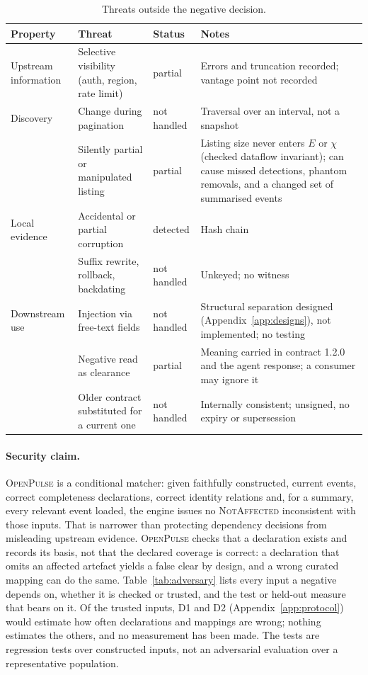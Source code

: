\documentclass[11pt,a4paper]{article}
\newcommand{\op}{\textsc{OpenPulse}}
\begin{document}
\begin{table}[t]
\centering
\footnotesize
\begin{tabularx}{\linewidth}{@{}>{\raggedright\arraybackslash}p{2.6cm} >{\raggedright\arraybackslash}p{3.8cm} >{\raggedright\arraybackslash}p{1.6cm} >{\raggedright\arraybackslash}X@{}}
\toprule
Property & Threat & Status & Notes \\
\midrule
Upstream information & Selective visibility (auth, region, rate limit) & partial & Errors and
  truncation recorded; vantage point not recorded \\
Discovery & Change during pagination & not handled & Traversal over an interval, not a
  snapshot \\
 & Silently partial or manipulated listing & partial & Listing size never
  enters $E$ or $\chi$ (checked dataflow invariant); can cause missed
  detections, phantom removals, and a changed set of summarised events \\
Local evidence & Accidental or partial corruption & detected & Hash chain \\
 & Suffix rewrite, rollback, backdating & not handled & Unkeyed; no witness \\
Downstream use & Injection via free-text fields & not handled & Structural
  separation designed (Appendix~\ref{app:designs}), not implemented;
  no testing \\
 & Negative read as clearance & partial & Meaning carried in contract
  1.2.0 and the agent response; a consumer may ignore it \\
 & Older contract substituted for a current one & not handled & Internally
  consistent; unsigned, no expiry or supersession \\
\bottomrule
\end{tabularx}
\caption{Threats outside the negative decision.}
\label{tab:threats}
\end{table}

\paragraph{Security claim.} \op{} is a conditional matcher: given
faithfully constructed, current events, correct completeness
declarations, correct identity relations and, for a summary, every
relevant event loaded, the engine issues no \textsc{NotAffected}
inconsistent with those inputs. That is narrower than protecting
dependency decisions from misleading upstream evidence. \op{} checks
that a declaration exists and records its basis, not that the declared
coverage is correct: a declaration that omits an affected artefact
yields a false clear by design, and a wrong curated mapping can do the
same. Table~\ref{tab:adversary} lists every input a negative depends
on, whether it is checked or trusted, and the test or held-out measure
that bears on it. Of the trusted inputs, D1 and D2
(Appendix~\ref{app:protocol}) would estimate how often declarations and
mappings are wrong; nothing estimates the others, and no measurement
has been made. The tests are regression tests over constructed inputs,
not an adversarial evaluation over a representative population.
\end{document}
